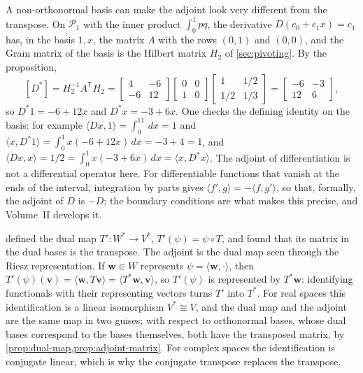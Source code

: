 A non-orthonormal basis can make the adjoint look very different from the transpose. On $\mathcal P_1$ with the inner product $\int_0^1pq$, the derivative $D(c_0+c_1x)=c_1$ has, in the basis $1,x$, the matrix $A$ with the rows $(0,1)$ and $(0,0)$, and the Gram matrix of the basis is the Hilbert matrix $H_2$ of \cref{sec:pivoting}. By the proposition,
\[
[D^*]=H_2^{-1}A^{\mathsf T}H_2=\begin{bmatrix}4&-6\\-6&12\end{bmatrix}\begin{bmatrix}0&0\\1&0\end{bmatrix}\begin{bmatrix}1&1/2\\1/2&1/3\end{bmatrix}=\begin{bmatrix}-6&-3\\12&6\end{bmatrix},
\]
so $D^*1=-6+12x$ and $D^*x=-3+6x$. One checks the defining identity on the basis: for example $\langle Dx,1\rangle=\int_0^11\,dx=1$ and $\langle x,D^*1\rangle=\int_0^1x(-6+12x)\,dx=-3+4=1$, and $\langle Dx,x\rangle=1/2=\int_0^1x(-3+6x)\,dx=\langle x,D^*x\rangle$. The adjoint of differentiation is not a differential operator here. For differentiable functions that vanish at the ends of the interval, integration by parts gives $\langle f',g\rangle=-\langle f,g'\rangle$, so that, formally, the adjoint of $D$ is $-D$; the boundary conditions are what makes this precise, and Volume~II develops it.

 defined the dual map $T'\colon W^*\to V^*$, $T'(\psi)=\psi\circ T$, and found that its matrix in the dual bases is the transpose. The adjoint is the dual map seen through the Riesz representation. If $\mathbf w\in W$ represents $\psi=\langle\mathbf w,\cdot\rangle$, then $T'(\psi)(\mathbf v)=\langle\mathbf w,T\mathbf v\rangle=\langle T^*\mathbf w,\mathbf v\rangle$, so $T'(\psi)$ is represented by $T^*\mathbf w$: identifying functionals with their representing vectors turns $T'$ into $T^*$. For real spaces this identification is a linear isomorphism $V^*\cong V$, and the dual map and the adjoint are the same map in two guises; with respect to orthonormal bases, whose dual bases correspond to the bases themselves, both have the transposed matrix, by \cref{prop:dual-map,prop:adjoint-matrix}. For complex spaces the identification is conjugate linear, which is why the conjugate transpose replaces the transpose.

